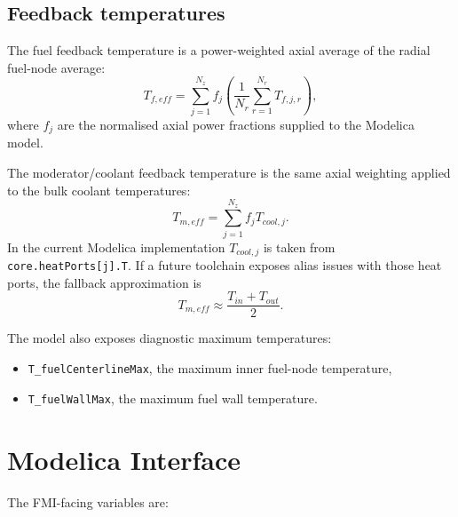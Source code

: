 \documentclass[11pt]{article}
\begin{document}
\subsection{Feedback temperatures}

The fuel feedback temperature is a power-weighted axial average of the
radial fuel-node average:
\[
T_{f,eff} = \sum_{j=1}^{N_z} f_j
  \left(\frac{1}{N_r}\sum_{r=1}^{N_r} T_{f,j,r}\right),
\]
where $f_j$ are the normalised axial power fractions supplied to the
Modelica model.

The moderator/coolant feedback temperature is the same axial weighting
applied to the bulk coolant temperatures:
\[
T_{m,eff} = \sum_{j=1}^{N_z} f_j T_{cool,j}.
\]
In the current Modelica implementation $T_{cool,j}$ is taken from
\texttt{core.heatPorts[j].T}.  If a future toolchain exposes alias issues
with those heat ports, the fallback approximation is
\[
T_{m,eff} \approx \frac{T_{in}+T_{out}}{2}.
\]

The model also exposes diagnostic maximum temperatures:
\begin{itemize}
  \item \texttt{T\_fuelCenterlineMax}, the maximum inner fuel-node temperature,
  \item \texttt{T\_fuelWallMax}, the maximum fuel wall temperature.
\end{itemize}

\section{Modelica Interface}

The FMI-facing variables are:
\end{document}
